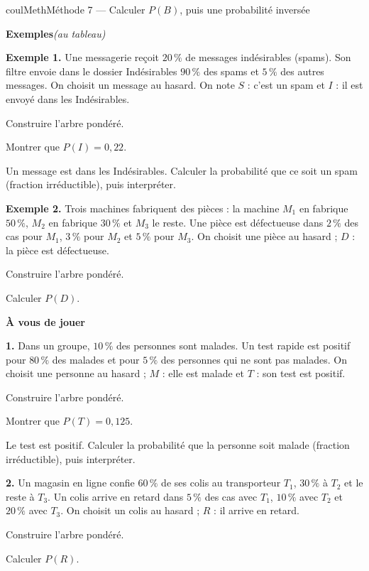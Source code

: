 \documentclass[11pt,a4paper]{article}
\makeatletter
\newcounter{lycee@signet}
\newcommand{\signet}[3][]{\stepcounter{lycee@signet}%
  \edef\lycee@dest{\if\relax\detokenize{#1}\relax
    signet.\arabic{lycee@signet}\else#1\fi}%
  \hypertarget{\lycee@dest}{}\bookmark[level=#2,dest=\lycee@dest]{#3}}
\newcounter{methode}
\newenvironment{methodebox}[1][Méthode]{\stepcounter{methode}%
  \begin{boitecours}[phantom={\signet[methode-\arabic{methode}]{2}{#1}}]{coulMeth}{#1}}%
  {\end{boitecours}}
\newcommand{\etape}[1]{\par\smallskip\textbf{\color{coulMeth}#1}\par\nobreak\smallskip}
\newcommand{\autableau}{\hfill{\footnotesize\itshape\color{black!45}(au tableau)}}
\newcommand{\etapeexemples}{%
    \par\smallskip\textbf{\color{coulMeth}Exemples}\autableau\par\nobreak\smallskip}
\makeatother
\begin{document}
\begin{methodebox}[Méthode 7 --- Calculer $P(B)$, puis une probabilité \og inversée\fg]
\etapeexemples
\textbf{Exemple 1.} Une messagerie reçoit $20\,\%$ de messages indésirables
(\og spams\fg). Son filtre envoie dans le dossier \og Indésirables\fg{} $90\,\%$ des
spams et $5\,\%$ des autres messages. On choisit un message au hasard. On note $S$ :
\og c'est un spam\fg{} et $I$ : \og il est envoyé dans les Indésirables\fg.
\begin{questions}[label=\alph*)]
  \item Construire l'arbre pondéré.
  \item Montrer que $P(I)=0{,}22$.
  \item Un message est dans les Indésirables. Calculer la probabilité que ce soit un
    spam (fraction irréductible), puis interpréter.
\end{questions}

\medskip
\textbf{Exemple 2.} Trois machines fabriquent des pièces : la machine $M_{1}$ en
fabrique $50\,\%$, $M_{2}$ en fabrique $30\,\%$ et $M_{3}$ le reste. Une pièce est
défectueuse dans $2\,\%$ des cas pour $M_{1}$, $3\,\%$ pour $M_{2}$ et $5\,\%$ pour
$M_{3}$. On choisit une pièce au hasard ; $D$ : \og la pièce est défectueuse\fg.
\begin{questions}[label=\alph*)]
  \item Construire l'arbre pondéré.
  \item Calculer $P(D)$.
\end{questions}

\etape{À vous de jouer}
\textbf{1.} Dans un groupe, $10\,\%$ des personnes sont malades. Un test rapide est
positif pour $80\,\%$ des malades et pour $5\,\%$ des personnes qui ne sont pas
malades. On choisit une personne au hasard ; $M$ : \og elle est malade\fg{} et
$T$ : \og son test est positif\fg.
\begin{questions}[label=\alph*)]
  \item Construire l'arbre pondéré.
  \item Montrer que $P(T)=0{,}125$.
  \item Le test est positif. Calculer la probabilité que la personne soit malade
    (fraction irréductible), puis interpréter.
\end{questions}
\textbf{2.} Un magasin en ligne confie $60\,\%$ de ses colis au transporteur $T_{1}$,
$30\,\%$ à $T_{2}$ et le reste à $T_{3}$. Un colis arrive en retard dans $5\,\%$ des cas
avec $T_{1}$, $10\,\%$ avec $T_{2}$ et $20\,\%$ avec $T_{3}$. On choisit un colis au
hasard ; $R$ : \og il arrive en retard\fg.
\begin{questions}[label=\alph*)]
  \item Construire l'arbre pondéré.
  \item Calculer $P(R)$.
\end{questions}

\end{methodebox}
\end{document}
